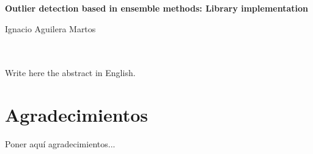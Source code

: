 \cleardoublepage


\thispagestyle{empty}


\begin{center}
{\large\bfseries Outlier detection based in ensemble methods: Library implementation}\\
\end{center}
\begin{center}
Ignacio Aguilera Martos\\
\end{center}

\\

\vspace{0.7cm}
\\

Write here the abstract in English.

\chapter*{Agradecimientos}
\thispagestyle{empty}

       \vspace{1cm}


Poner aquí agradecimientos...

